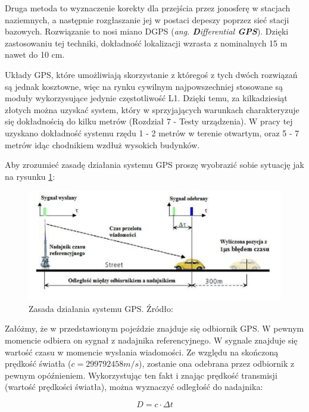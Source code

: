 Druga metoda to wyznaczenie korekty dla przejścia przez jonosferę w stacjach naziemnych, a następnie rozgłaszanie jej w postaci depeszy poprzez sieć stacji bazowych. Rozwiązanie to nosi miano DGPS (\textit{ang. \textbf{D}ifferential \textbf{GPS}}). Dzięki zastosowaniu tej techniki, dokładność lokalizacji wzrasta z nominalnych 15 m nawet do 10 cm.

Układy GPS, które umożliwiają skorzystanie z któregoś z tych dwóch rozwiązań są jednak kosztowne, więc na rynku cywilnym najpowszechniej stosowane są moduły wykorzysujące jedynie częstotliwość L1. Dzięki temu, za kilkadziesiąt złotych można uzyskać system, który w sprzyjających warunkach charakteryzuje się dokładnością do kilku metrów\cite{inzynierka} (Rozdział 7 - Testy urządzenia). W pracy tej uzyskano dokładność systemu rzędu 1 - 2 metrów w terenie otwartym, oraz 5 - 7 metrów idąc chodnikiem wzdłuż wysokich budynków.

Aby zrozumieć zasadę działania systemu GPS proszę wyobrazić sobie sytuację jak na rysunku \ref{fig:image_gps_basics1}:

\begin{figure}[H]
	\centering
	\includegraphics[width=12cm]{img/theory/GPS/gps_basics1.png}
	\caption{Zasada działania systemu GPS. Źródło: \cite{inzynierka}}
	\label{fig:image_gps_basics1}
\end{figure}

Załóżmy, że w przedstawionym pojeździe znajduje się odbiornik GPS. W pewnym momencie odbiera on sygnał z nadajnika referencyjnego. W sygnale znajduje się wartość czasu w momencie wysłania wiadomości. Ze względu na skończoną prędkość światła ($c = 299 792 458 m/s$), zostanie ona odebrana przez odbiornik z pewnym opóźnieniem. Wykorzystując ten fakt i znając prędkość transmisji (wartość prędkości światła), można wyznaczyć odległość do nadajnika:

\begin{equation}
	D = c \cdot \Delta t
\end{equation}

